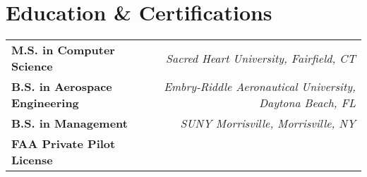 \section*{Education \& Certifications}
\begin{tabularx}{\textwidth}{@{} >{\raggedright}X r @{}}
    \textbf{M.S. in Computer Science} & \textit{Sacred Heart University, Fairfield, CT} \\
    \textbf{B.S. in Aerospace Engineering} & \textit{Embry-Riddle Aeronautical University, Daytona Beach, FL} \\
    \textbf{B.S. in Management} & \textit{SUNY Morrisville, Morrisville, NY} \\
    \textbf{FAA Private Pilot License} & \\
\end{tabularx}